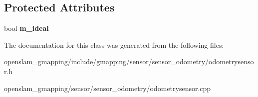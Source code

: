 \subsection*{Protected Attributes}
\begin{DoxyCompactItemize}
\item 
\mbox{\label{classGMapping_1_1OdometrySensor_a2dde536f69a69842a0c0a8ec9c291c18}} 
bool {\bfseries m\+\_\+ideal}
\end{DoxyCompactItemize}


The documentation for this class was generated from the following files\+:\begin{DoxyCompactItemize}
\item 
openslam\+\_\+gmapping/include/gmapping/sensor/sensor\+\_\+odometry/odometrysensor.\+h\item 
openslam\+\_\+gmapping/sensor/sensor\+\_\+odometry/odometrysensor.\+cpp\end{DoxyCompactItemize}
